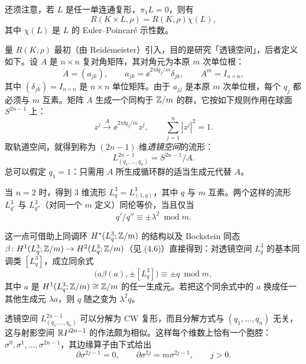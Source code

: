
还须注意，若 $L$ 是任一单连通复形，$\pi_1L=0$，则有
\[
  R(K\times L,\rho)=R(K,\rho)\chi(L),
\]
其中 $\chi(L)$ 是 $L$ 的 Euler--Poincaré 示性数。

量 $R(K,\rho)$ 最初（由 Reidemeister）引入，目的是研究「透镜空间」，后者定义如下。设 $A$ 是 $n\times n$ 复对角矩阵，其对角元为本原 $m$ 次单位根：
\begin{equation}
  A=(a_{jk}),\qquad a_{jk}=\ee^{2\pi\ii q_j/m}\delta_{jk},\qquad A^m=I_{n\times n}, \tag{5.6}
\end{equation}
其中 $(\delta_{jk})=I_{n\times n}$ 是 $n\times n$ 单位矩阵。由于 $a_{jj}$ 是本原 $m$ 次单位根，每个 $q_j$ 都必须与 $m$ 互素。矩阵 $A$ 生成一个同构于 $\mathbb{Z}/m$ 的群，它按如下规则作用在球面 $S^{2n-1}$ 上：
\begin{equation}
  z^j\xrightarrow{A}\ee^{2\pi\ii q_j/m}z^j,\qquad \sum_{j=1}^{n}|z^j|^2=1. \tag{5.7}
\end{equation}
取轨道空间，就得到称为 $(2n-1)$ 维\emph{透镜空间}的流形：
\begin{equation}
  L^{2n-1}_{(q_1,\dots,q_n)}=S^{2n-1}/A. \tag{5.8}
\end{equation}
总可以假定 $q_1=1$：只需用 $A$ 所生成循环群的适当生成元代替 $A$。

当 $n=2$ 时，得到 3 维流形 $L^3_q=L^3_{(1,q)}$，其中 $q$ 与 $m$ 互素。两个这样的流形 $L^3_{q'}$ 与 $L^3_{q''}$（对同一个 $m$ 定义）同伦等价，当且仅当
\begin{equation}
  q'/q''\equiv\pm\lambda^2\ \operatorname{mod} m. \tag{5.9}
\end{equation}

这一点可借助上同调环 $H^*(L^3_q;\mathbb{Z}/m)$ 的结构以及 Bockstein 同态 $\beta\colon H^1(L^3_q;\mathbb{Z}/m)\to H^2(L^3_q;\mathbb{Z}/m)$（见 (4.6)）直接得到：对透镜空间 $L^3_q$ 的基本同调类 $[L^3_q]$，成立同余式
\[
  \bigl(a\beta(a),\pm[L^3_q]\bigr)\equiv\pm q\ \operatorname{mod} m,
\]
其中 $a$ 是 $H^1(L^3_q;\mathbb{Z}/m)\cong\mathbb{Z}/m$ 的任一生成元。若把这个同余式中的 $a$ 换成任一其他生成元 $\lambda a$，则 $q$ 随之变为 $\lambda^2 q$。

透镜空间 $L^{2n-1}_{(q_1,\dots,q_n)}$ 可以分解为 CW 复形，而且分解方式与 $(q_1,\dots,q_n)$ 无关，这与射影空间 $\mathbb{R}P^{2n-1}$ 的作法颇为相似。这样每个维数上恰有一个胞腔：$\sigma^0,\sigma^1,\dots,\sigma^{2n-1}$，其边缘算子由下式给出
\begin{equation}
  \partial\sigma^{2j-1}=0,\qquad \partial\sigma^{2j}=m\sigma^{2j-1},\qquad j>0. \tag{5.10}
\end{equation}


